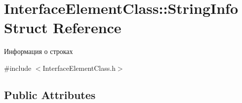 \hypertarget{struct_interface_element_class_1_1_string_info}{}\section{Interface\+Element\+Class\+:\+:String\+Info Struct Reference}
\label{struct_interface_element_class_1_1_string_info}


Информация о строках  




{\ttfamily \#include $<$Interface\+Element\+Class.\+h$>$}

\subsection*{Public Attributes}
